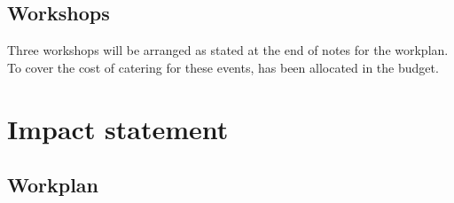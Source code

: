 \documentclass[a4paper,11pt]{article}
\begin{document}
    \subsection{Workshops}

    Three workshops will be arranged as stated at the end of notes for the workplan. To cover the cost of catering for these events,  has been allocated in the budget.

    \newpage
    \section{Impact statement}

    \newpage
    \begin{landscape}
    \section{Workplan}


\end{landscape}
\end{document}
